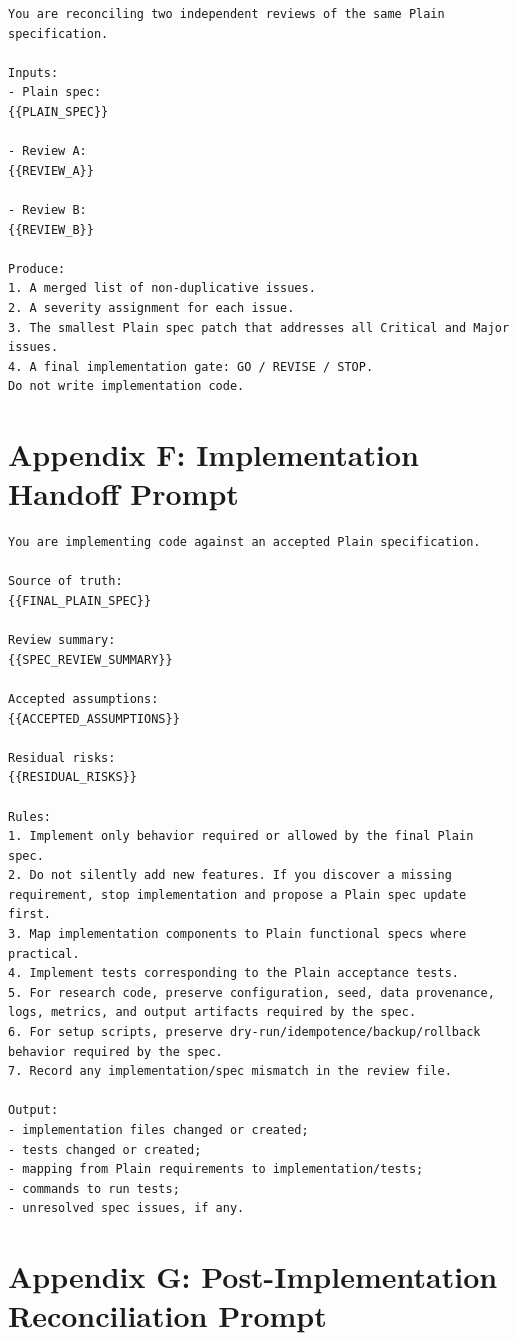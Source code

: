 \documentclass[11pt]{article}
\begin{document}
\begin{lstlisting}
You are reconciling two independent reviews of the same Plain specification.

Inputs:
- Plain spec:
{{PLAIN_SPEC}}

- Review A:
{{REVIEW_A}}

- Review B:
{{REVIEW_B}}

Produce:
1. A merged list of non-duplicative issues.
2. A severity assignment for each issue.
3. The smallest Plain spec patch that addresses all Critical and Major issues.
4. A final implementation gate: GO / REVISE / STOP.
Do not write implementation code.
\end{lstlisting}

\section{Appendix F: Implementation Handoff Prompt}

\begin{lstlisting}
You are implementing code against an accepted Plain specification.

Source of truth:
{{FINAL_PLAIN_SPEC}}

Review summary:
{{SPEC_REVIEW_SUMMARY}}

Accepted assumptions:
{{ACCEPTED_ASSUMPTIONS}}

Residual risks:
{{RESIDUAL_RISKS}}

Rules:
1. Implement only behavior required or allowed by the final Plain spec.
2. Do not silently add new features. If you discover a missing requirement, stop implementation and propose a Plain spec update first.
3. Map implementation components to Plain functional specs where practical.
4. Implement tests corresponding to the Plain acceptance tests.
5. For research code, preserve configuration, seed, data provenance, logs, metrics, and output artifacts required by the spec.
6. For setup scripts, preserve dry-run/idempotence/backup/rollback behavior required by the spec.
7. Record any implementation/spec mismatch in the review file.

Output:
- implementation files changed or created;
- tests changed or created;
- mapping from Plain requirements to implementation/tests;
- commands to run tests;
- unresolved spec issues, if any.
\end{lstlisting}

\section{Appendix G: Post-Implementation Reconciliation Prompt}
\end{document}
